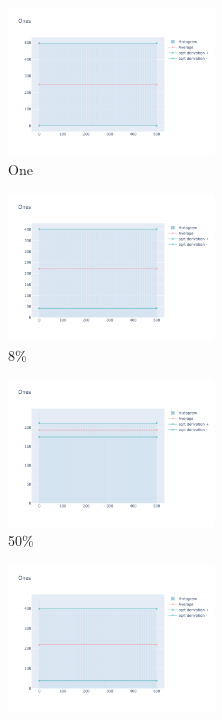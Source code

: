 \documentclass[12pt, fleqn]{report}                             %
\theoremstyle{break}                                            %
\begin{document}
      \begin{figure}[ht!]
        \centering
        \begin{subfigure}[b]{0.4\linewidth}
          \includegraphics[width=0.6\textwidth]{Images/33/dia-a.png}
          \caption{One}
        \end{subfigure}
        \begin{subfigure}[b]{0.4\linewidth}
          \includegraphics[width=0.6\textwidth]{Images/33/dia-b.png}
          \caption{8\%}
        \end{subfigure}
        \begin{subfigure}[b]{0.4\linewidth}
          \includegraphics[width=0.6\textwidth]{Images/33/dia-c.png}
          \caption{50\%}
        \end{subfigure}
        \begin{subfigure}[b]{0.4\linewidth}
          \includegraphics[width=0.6\textwidth]{Images/33/dia-d.png}

\end{subfigure}
\end{figure}
\end{document}
